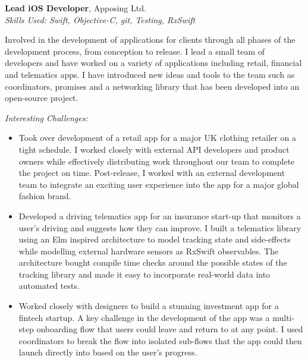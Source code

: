 %
\textbf{Lead iOS Developer}, Apposing Ltd. \\
\textit{Skills Used: Swift, Objective-C, git, Testing, RxSwift}

Involved in the development of applications for clients through all phases of
the development process, from conception to release. I lead a small team of
developers and have worked on a variety of applications including retail,
financial and telematics apps. I have introduced new ideas and tools to the team
such as coordinators, promises and a networking library that has been developed
into an open-source project.

\medskip

\textit{Interesting Challenges:}

\smallskip

\begin{itemize}
\item Took over development of a retail app for a major UK clothing retailer on
  a tight schedule. I worked closely with external API developers and product
  owners while effectively distributing work throughout our team to complete the
  project on time. Post-release, I worked with an external development team to
  integrate an exciting user experience into the app for a major global fashion
  brand.

\item Developed a driving telematics app for an insurance start-up that monitors
  a user's driving and suggests how they can improve. I built a telematics
  library using an Elm inspired architecture to model tracking state and
  side-effects while modelling external hardware sensors as RxSwift
  observables. The architecture bought compile time checks around the possible
  states of the tracking library and made it easy to incorporate real-world data
  into automated tests.

\item Worked closely with designers to build a stunning investment app for a
  fintech startup. A key challenge in the development of the app was a
  multi-step onboarding flow that users could leave and return to at any
  point. I used coordinators to break the flow into isolated sub-flows that the
  app could then launch directly into based on the user's progress.

\end{itemize}

\bigskip

